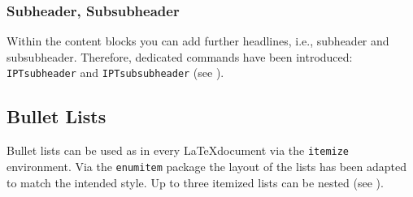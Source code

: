 \subsubsection{Subheader, Subsubheader} %
\label{ssub:subheader_subsubheader}

Within the content blocks you can add further headlines, i.e., subheader and subsubheader. Therefore, dedicated commands have been introduced: \texttt{\bs{}IPTsubheader} and \texttt{\bs{}IPTsubsubheader} (see ).








\subsection{Bullet Lists}

Bullet lists can be used as in every \LaTeX document via the \texttt{itemize} environment. Via the \texttt{enumitem} package the layout of the lists has been adapted to match the intended style. Up to three itemized lists can be nested (see ).

